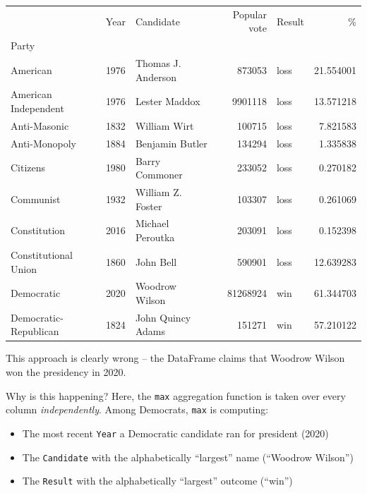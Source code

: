 \documentclass[
  letterpaper,
  DIV=11,
  numbers=noendperiod]{scrreprt}
\providecommand{\tightlist}{%
  \setlength{\itemsep}{0pt}\setlength{\parskip}{0pt}}\usepackage{longtable,booktabs,array}
\begin{document}
\begin{tabular}{lrlrlr}
\toprule
{} &  Year &           Candidate &  Popular vote & Result &          \% \\
Party                 &       &                     &               &        &            \\
\midrule
American              &  1976 &  Thomas J. Anderson &        873053 &   loss &  21.554001 \\
American Independent  &  1976 &       Lester Maddox &       9901118 &   loss &  13.571218 \\
Anti-Masonic          &  1832 &        William Wirt &        100715 &   loss &   7.821583 \\
Anti-Monopoly         &  1884 &     Benjamin Butler &        134294 &   loss &   1.335838 \\
Citizens              &  1980 &      Barry Commoner &        233052 &   loss &   0.270182 \\
Communist             &  1932 &   William Z. Foster &        103307 &   loss &   0.261069 \\
Constitution          &  2016 &    Michael Peroutka &        203091 &   loss &   0.152398 \\
Constitutional Union  &  1860 &           John Bell &        590901 &   loss &  12.639283 \\
Democratic            &  2020 &      Woodrow Wilson &      81268924 &    win &  61.344703 \\
Democratic-Republican &  1824 &   John Quincy Adams &        151271 &    win &  57.210122 \\
\bottomrule
\end{tabular}

This approach is clearly wrong -- the DataFrame claims that Woodrow
Wilson won the presidency in 2020.

Why is this happening? Here, the \texttt{max} aggregation function is
taken over every column \emph{independently}. Among Democrats,
\texttt{max} is computing:

\begin{itemize}
\tightlist
\item
  The most recent \texttt{Year} a Democratic candidate ran for president
  (2020)
\item
  The \texttt{Candidate} with the alphabetically ``largest'' name
  (``Woodrow Wilson'')
\item
  The \texttt{Result} with the alphabetically ``largest'' outcome
  (``win'')
\end{itemize}
\end{document}
